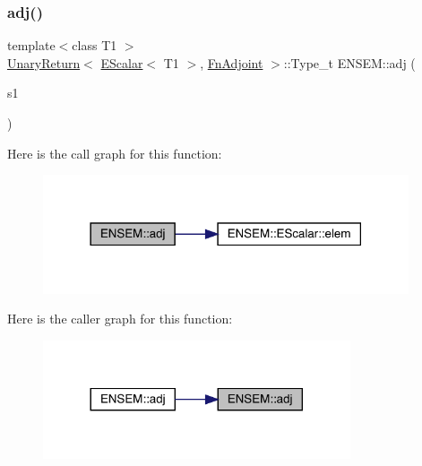 \subsubsection{\texorpdfstring{adj()}{adj()}}
{\footnotesize\ttfamily template$<$class T1 $>$ \\
\mbox{\hyperlink{structENSEM_1_1UnaryReturn}{Unary\+Return}}$<$ \mbox{\hyperlink{classENSEM_1_1EScalar}{E\+Scalar}}$<$ T1 $>$, \mbox{\hyperlink{structENSEM_1_1FnAdjoint}{Fn\+Adjoint}} $>$\+::Type\+\_\+t E\+N\+S\+E\+M\+::adj (\begin{DoxyParamCaption}\item[{const \mbox{\hyperlink{classENSEM_1_1EScalar}{E\+Scalar}}$<$ T1 $>$ \&}]{s1 }\end{DoxyParamCaption})\hspace{0.3cm}{\ttfamily [inline]}}

Here is the call graph for this function\+:\nopagebreak
\begin{figure}[H]
\begin{center}
\leavevmode
\includegraphics[width=306pt]{d4/dca/group__escalar_ga51071562edd203962f48e4b44f0c0a0c_cgraph}
\end{center}
\end{figure}
Here is the caller graph for this function\+:\nopagebreak
\begin{figure}[H]
\begin{center}
\leavevmode
\includegraphics[width=257pt]{d4/dca/group__escalar_ga51071562edd203962f48e4b44f0c0a0c_icgraph}
\end{center}
\end{figure}
\mbox{\label{group__escalar_ga8cef36c4e2779c7d7dbf64b9500b053c}} 
